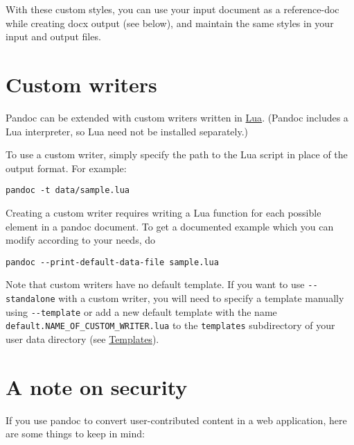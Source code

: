 \documentclass[]{article}
\begin{document}
With these custom styles, you can use your input document as a
reference-doc while creating docx output (see below), and maintain the
same styles in your input and output files.

\hypertarget{custom-writers}{%
\section{Custom writers}\label{custom-writers}}

Pandoc can be extended with custom writers written in
\href{https://www.lua.org}{Lua}. (Pandoc includes a Lua interpreter, so
Lua need not be installed separately.)

To use a custom writer, simply specify the path to the Lua script in
place of the output format. For example:

\begin{verbatim}
pandoc -t data/sample.lua
\end{verbatim}

Creating a custom writer requires writing a Lua function for each
possible element in a pandoc document. To get a documented example which
you can modify according to your needs, do

\begin{verbatim}
pandoc --print-default-data-file sample.lua
\end{verbatim}

Note that custom writers have no default template. If you want to use
\texttt{-\/-standalone} with a custom writer, you will need to specify a
template manually using \texttt{-\/-template} or add a new default
template with the name \texttt{default.NAME\_OF\_CUSTOM\_WRITER.lua} to
the \texttt{templates} subdirectory of your user data directory (see
\protect\hyperlink{templates}{Templates}).

\hypertarget{a-note-on-security}{%
\section{A note on security}\label{a-note-on-security}}

If you use pandoc to convert user-contributed content in a web
application, here are some things to keep in mind:
\end{document}
